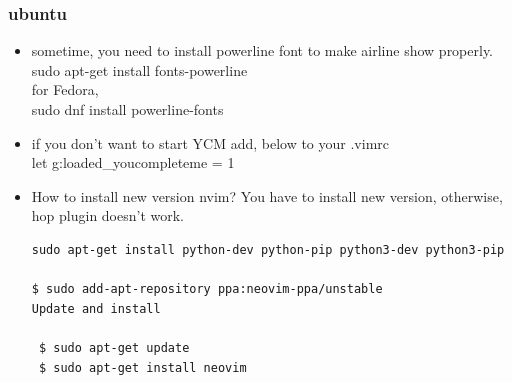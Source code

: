 \documentclass[a4paper,11pt,twoside]{book}
\begin{document}
\subsubsection{ubuntu}
\begin{itemize}
    \item sometime, you need to install powerline font to make airline show properly.
sudo apt-get install fonts-powerline \\
for Fedora, \\
sudo dnf install powerline-fonts
\item if you don't want to start YCM add, below to your .vimrc \\
let g:loaded\_youcompleteme = 1
\item How to install new version nvim? You have to install new version, otherwise, hop plugin doesn't work. 
\begin{verbatim}
sudo apt-get install python-dev python-pip python3-dev python3-pip

$ sudo add-apt-repository ppa:neovim-ppa/unstable 
Update and install

 $ sudo apt-get update
 $ sudo apt-get install neovim
\end{verbatim}	
\end{itemize}
\end{document}
